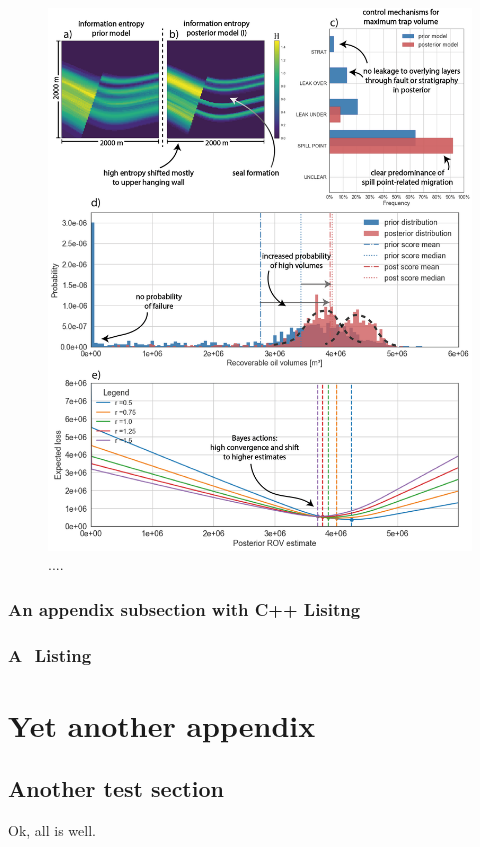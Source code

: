 \documentclass[a4paper,11pt]{MScThesis}
\begin{document}
    \begin{figure}[p!]
    	\centering
    	\includegraphics[width=1\textwidth]{Figures/Appendix/ML4}
    	\caption{....}\label{fig:ML4}
    \end{figure}

    \subsection{An appendix subsection with C++ Lisitng}

    \lstset{language=C++}
    

    \subsection{A \matlab $ $ Listing}

    \lstset{language=matlab}
    

    \chapter{Yet another appendix}

    \section{Another test section}

    Ok, all is well.

    \printindex
    \cleardoublepage
\end{document}
